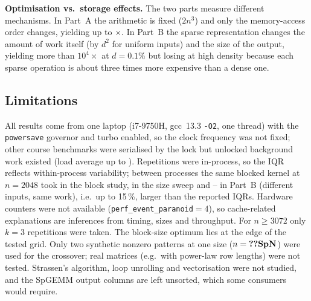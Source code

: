\documentclass[conference,a4paper]{IEEEtran}
\begin{document}
\textbf{Optimisation vs.\ storage effects.} The two parts measure different mechanisms. In Part~A the
arithmetic is fixed ($2n^3$) and only the memory-access order changes, yielding up to
$\times$. In Part~B the sparse representation changes the amount of work itself (by $d^2$ for
uniform inputs) and the size of the output, yielding more than $10^4\times$ at $d=0.1\%$ but losing at high
density because each sparse operation is about three times more expensive than a dense one.

\subsection{Limitations}
\label{sec:limits}
All results come from one laptop (i7-9750H, gcc~13.3 \texttt{-O2}, one thread) with the \texttt{powersave}
governor and turbo enabled, so the clock frequency was not fixed; other course benchmarks were serialised by
the lock but unlocked background work existed (load average up to ). Repetitions were in-process,
so the IQR reflects within-process variability; between processes the same blocked kernel at $n=2048$ took
 in the block study,  in the size sweep and --
in Part~B (different inputs, same work), i.e.\ up to 15\,\%, larger than the reported IQRs. Hardware counters
were not available (\texttt{perf\_event\_paranoid}$=4$), so cache-related explanations are inferences from timing,
sizes and throughput. For $n\ge 3072$ only $k=3$ repetitions were taken. The block-size optimum lies at the
edge of the tested grid. Only two synthetic nonzero patterns at one size ($n=\val{SpN}$) were used for the
crossover; real matrices (e.g.\ with power-law row lengths) were not tested. Strassen's algorithm, loop
unrolling and vectorisation were not studied, and the SpGEMM output columns are left unsorted, which some
consumers would require.

\end{document}

